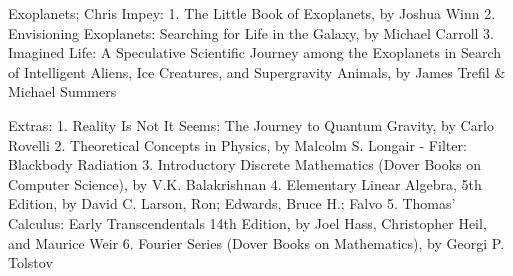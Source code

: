 Exoplanets;
Chris Impey:
1. The Little Book of Exoplanets, by Joshua Winn
2. Envisioning Exoplanets: Searching for Life in the Galaxy, by Michael Carroll
3. Imagined Life: A Speculative Scientific Journey among the Exoplanets in Search of Intelligent Aliens, Ice Creatures, and Supergravity Animals, by James Trefil \& Michael Summers

Extras:
1. Reality Is Not It Seems: The Journey to Quantum Gravity, by Carlo Rovelli
2. Theoretical Concepts in Physics, by Malcolm S. Longair
    - Filter: Blackbody Radiation
3. Introductory Discrete Mathematics (Dover Books on Computer Science), by V.K. Balakrishnan
4. Elementary Linear Algebra, 5th Edition, by David C. Larson, Ron; Edwards, Bruce H.; Falvo
5. Thomas' Calculus: Early Transcendentals 14th Edition, by Joel Hass, Christopher Heil, and Maurice Weir
6. Fourier Series (Dover Books on Mathematics), by Georgi P. Tolstov

